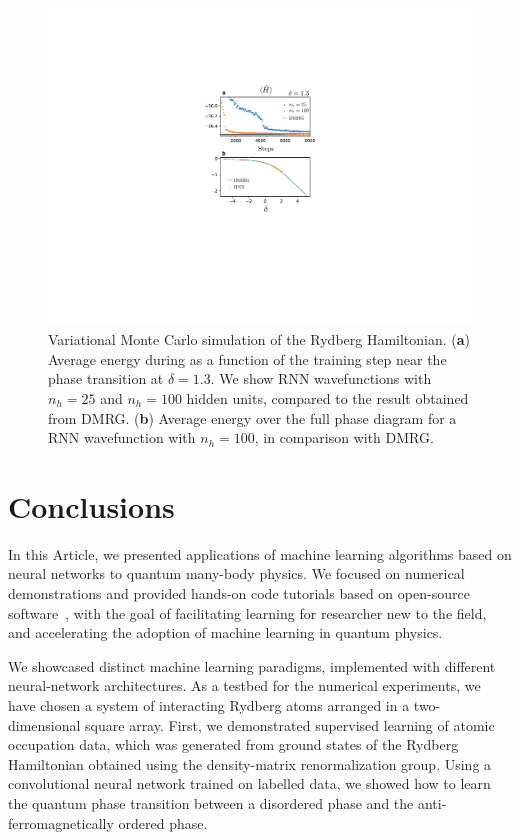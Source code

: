 \documentclass[twocolumn,english,reprint,superscriptaddress,longbibliography,pra]{revtex4-1}
\begin{document}
\begin{figure}[t]
\noindent \centering{}\includegraphics[width=\columnwidth]{fig_vmc}
\caption{Variational Monte Carlo simulation of the Rydberg Hamiltonian. ({\bf a}) Average energy during as a function of the training step near the phase transition at $\delta=1.3$. We show RNN wavefunctions with $n_h=25$ and $n_h=100$ hidden units, compared to the result obtained from DMRG. ({\bf b}) Average energy over the full phase diagram for a RNN wavefunction with $n_h=100$, in comparison with DMRG.}
\label{Fig::vmc} 
\end{figure}

\section{Conclusions}
In this Article, we presented applications of machine learning algorithms based on neural networks to quantum many-body physics. We focused on numerical demonstrations and provided hands-on code tutorials based on open-source software~\cite{tensorflow,netket,itensor}, with the goal of facilitating learning for researcher new to the field, and accelerating the adoption of machine learning in  quantum physics.

We showcased distinct machine learning paradigms, implemented with different neural-network architectures. As a testbed for the numerical experiments, we have chosen a system of interacting Rydberg atoms arranged in a two-dimensional square array. First, we demonstrated supervised learning of atomic occupation data, which was generated from ground states of the Rydberg Hamiltonian obtained using the density-matrix renormalization group. Using a convolutional neural network trained on labelled data, we showed how to learn the quantum phase transition between a disordered phase and the anti-ferromagnetically ordered phase. 
\end{document}
